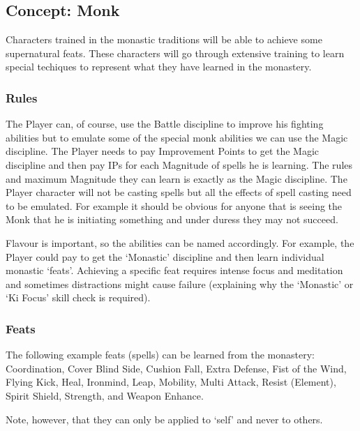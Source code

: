 \subsection{Concept: Monk}
Characters trained in the monastic traditions will be able to achieve some supernatural feats. These characters will go through extensive training to learn special techiques to represent what they have learned in the monastery.

\subsubsection{Rules}
The Player can, of course, use the Battle discipline to improve his fighting abilities but to emulate some of the special monk abilities we can use the Magic discipline. The Player needs to pay Improvement Points to get the Magic discipline and then pay IPs for each Magnitude of spells he is learning. The rules and maximum Magnitude they can learn is exactly as the Magic discipline. The Player character will not be casting spells but all the effects of spell casting need to be emulated. For example it should be obvious for anyone that is seeing the Monk that he is initiating something and under duress they may not succeed.

Flavour is important, so the abilities can be named accordingly. For example, the Player could pay to get the `Monastic' discipline and then learn individual monastic `feats'. Achieving a specific feat requires intense focus and meditation and sometimes distractions might cause failure (explaining why the `Monastic' or `Ki Focus' skill check is required).

\subsubsection{Feats}
The following example feats (spells) can be learned from the monastery: Coordination, Cover Blind Side, Cushion Fall, Extra Defense, Fist of the Wind, Flying Kick, Heal, Ironmind, Leap, Mobility, Multi Attack, Resist (Element), Spirit Shield, Strength, and Weapon Enhance.

Note, however, that they can only be applied to `self' and never to others.





